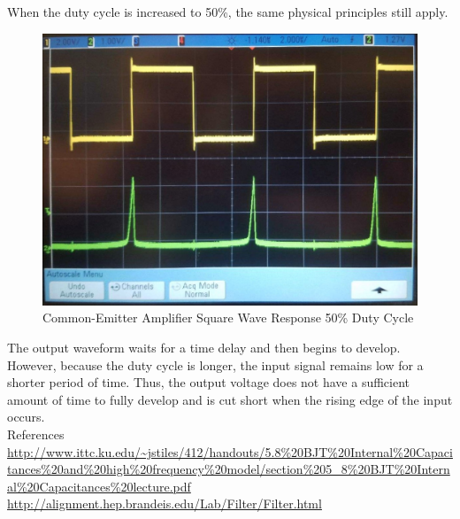 When the duty cycle is increased to 50\%, the same physical principles still apply.
\FloatBarrier
\begin{figure}[h!]
	\centering
	\includegraphics[scale=0.25]{../images/amplifier_50_duty_cycle.jpeg}
	\caption{Common-Emitter Amplifier Square Wave Response 50\% Duty Cycle}
	\label{fig:fifty_perc_duty_cycle}
\end{figure}
\FloatBarrier
The output waveform waits for a time delay and then begins to develop. However, because the duty cycle is longer, the input signal remains low for a shorter period of time. Thus, the output voltage does not have a sufficient amount of time to fully develop and is cut short when the rising edge of the input occurs. \\

References \\
\url{http://www.ittc.ku.edu/~jstiles/412/handouts/5.8\%20BJT\%20Internal\%20Capacitances\%20and\%20high\%20frequency\%20model/section\%205_8\%20BJT\%20Internal\%20Capacitances\%20lecture.pdf} \\ %
\url{http://alignment.hep.brandeis.edu/Lab/Filter/Filter.html} \\ %
